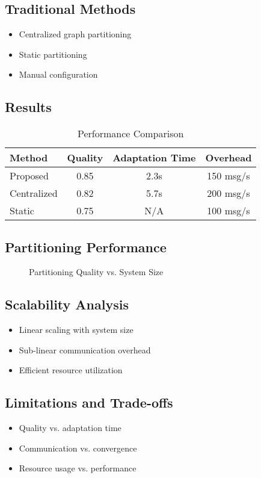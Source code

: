 \subsection{Traditional Methods}
\begin{itemize}
    \item Centralized graph partitioning
    \item Static partitioning
    \item Manual configuration
\end{itemize}

\subsection{Results}
\begin{table}[H]
\centering
\caption{Performance Comparison}
\begin{tabular}{lccc}
\toprule
Method & Quality & Adaptation Time & Overhead \\
\midrule
Proposed & 0.85 & 2.3s & 150 msg/s \\
Centralized & 0.82 & 5.7s & 200 msg/s \\
Static & 0.75 & N/A & 100 msg/s \\
\bottomrule
\end{tabular}
\label{tab:comparison}
\end{table}

\subsection{Partitioning Performance}
\begin{figure}[H]
\centering
{}
\caption{Partitioning Quality vs. System Size}
\label{fig:performance}
\end{figure}

\subsection{Scalability Analysis}
\begin{itemize}
    \item Linear scaling with system size
    \item Sub-linear communication overhead
    \item Efficient resource utilization
\end{itemize}

\subsection{Limitations and Trade-offs}
\begin{itemize}
    \item Quality vs. adaptation time
    \item Communication vs. convergence
    \item Resource usage vs. performance
\end{itemize} 